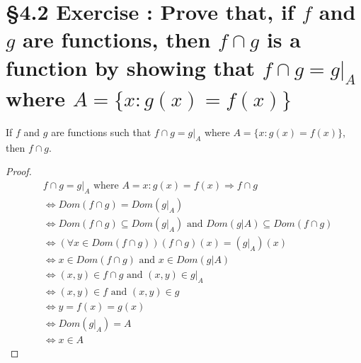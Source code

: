 \documentclass[a4paper,11pt]{article}
\begin{document}
\section*{\S 4.2 Exercise : Prove that, if \(f\) and \(g\) are functions, then \(f \cap g\) is a function by showing that \(f \cap g = g|_{A}\) where \(A=\{x:g{(x)} = 
f{(x)}\}\)}
\begin{theorem1}
If \(f\) and \(g\) are functions such that \(f \cap g = g|_{A}\) where \(A=\{x:g{(x)} = 
f{(x)}\}\), then \(f \cap g\).
\begin{proof}
\begin{align*}
  &f \cap g = g|_{A} \text{ where } A = {x: g{(x)} = f{(x)}} \Rightarrow f \cap 
  g\\
  &\Leftrightarrow Dom{(f \cap g)} = Dom{(g|_{A})}\\
  &\Leftrightarrow Dom{(f \cap g)} \subseteq Dom{(g|_{A})} \text{ and } Dom{(g|A)} \subseteq Dom{(f \cap 
  g)}\\
  &\Leftrightarrow {(\forall x \in Dom{(f \cap g)})} {(f \cap g)}{(x)} = {(g|_{A})}{(x)}\\
  &\Leftrightarrow x \in Dom{(f \cap g)} \text{ and } x \in Dom{(g|A)}\\
  &\Leftrightarrow {(x,y)} \in f \cap g \text{ and } {(x,y)} \in g|_{A}\\
  &\Leftrightarrow {(x,y)} \in f \text{ and } {(x,y)} \in g\\
  &\Leftrightarrow y=f{(x)}=g{(x)}\\
  &\Leftrightarrow Dom{(g|_{A})} = A\\
  &\Leftrightarrow x \in A
 \end{align*}
\end{proof}
\end{theorem1}
\newpage
\setcounter{ProblemCounter}{18}
\end{document}
